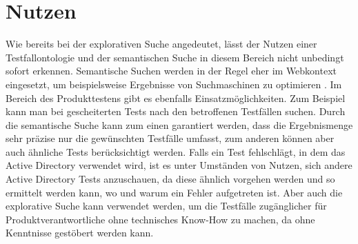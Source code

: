 \section{Nutzen}
Wie bereits bei der explorativen Suche angedeutet, lässt der Nutzen einer Testfallontologie und der semantischen Suche in diesem Bereich nicht unbedingt sofort erkennen. Semantische Suchen werden in der Regel eher im Webkontext eingesetzt, um beispielsweise Ergebnisse von Suchmaschinen zu optimieren \cite[S.19]{Sack.2010}.\newline
Im Bereich des Produkttestens gibt es ebenfalls Einsatzmöglichkeiten. Zum Beispiel kann man bei gescheiterten Tests nach den betroffenen Testfällen suchen. Durch die semantische Suche kann zum einen garantiert werden, dass die Ergebnismenge sehr präzise nur die gewünschten Testfälle umfasst, zum anderen können aber auch ähnliche Tests berücksichtigt werden. Falls ein Test fehlschlägt, in dem das Active Directory verwendet wird, ist es unter Umständen von Nutzen, sich andere Active Directory Tests anzuschauen, da diese ähnlich vorgehen werden und so ermittelt werden kann, wo und warum ein Fehler aufgetreten ist. Aber auch die explorative Suche kann verwendet werden, um die Testfälle zugänglicher für Produktverantwortliche ohne technisches Know-How zu machen, da ohne Kenntnisse \glqq gestöbert\grqq{} werden kann. 
